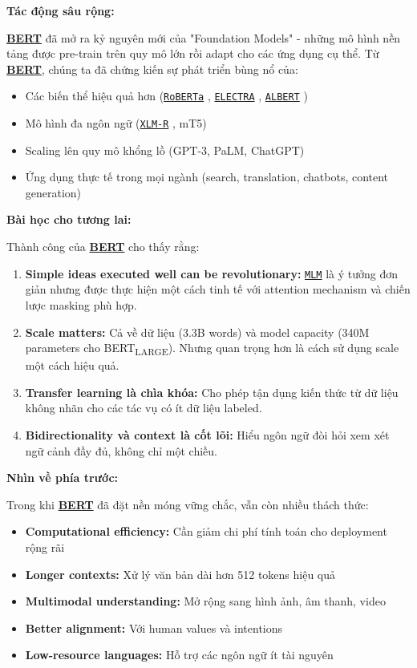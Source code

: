 \textbf{Tác động sâu rộng:}

\hyperref[acro:bert]{\textbf{BERT}} đã mở ra kỷ nguyên mới của "Foundation Models" - những mô hình nền tảng được pre-train trên quy mô lớn rồi adapt cho các ứng dụng cụ thể. Từ \hyperref[acro:bert]{\textbf{BERT}}, chúng ta đã chứng kiến sự phát triển bùng nổ của:

\begin{itemize}
    \item Các biến thể hiệu quả hơn (\hyperref[acro:roberta]{\texttt{RoBERTa}} \cite{liu2019roberta}, \hyperref[acro:electra]{\texttt{ELECTRA}} \cite{clark2020electra}, \hyperref[acro:albert]{\texttt{ALBERT}} \cite{lan2019albert})
    \item Mô hình đa ngôn ngữ (\hyperref[acro:xlm-r]{\texttt{XLM-R}} \cite{conneau2019unsupervised}, mT5)
    \item Scaling lên quy mô khổng lồ (GPT-3, PaLM, ChatGPT)
    \item Ứng dụng thực tế trong mọi ngành (search, translation, chatbots, content generation)
\end{itemize}

\textbf{Bài học cho tương lai:}

Thành công của \hyperref[acro:bert]{\textbf{BERT}} cho thấy rằng:
\begin{enumerate}
    \item \textbf{Simple ideas executed well can be revolutionary:} \hyperref[acro:mlm]{\texttt{MLM}} là ý tưởng đơn giản nhưng được thực hiện một cách tinh tế với attention mechanism và chiến lược masking phù hợp.
    
    \item \textbf{Scale matters:} Cả về dữ liệu (3.3B words) và model capacity (340M parameters cho BERT\textsubscript{LARGE}). Nhưng quan trọng hơn là cách sử dụng scale một cách hiệu quả.
    
    \item \textbf{Transfer learning là chìa khóa:} Cho phép tận dụng kiến thức từ dữ liệu không nhãn cho các tác vụ có ít dữ liệu labeled.
    
    \item \textbf{Bidirectionality và context là cốt lõi:} Hiểu ngôn ngữ đòi hỏi xem xét ngữ cảnh đầy đủ, không chỉ một chiều.
\end{enumerate}

\textbf{Nhìn về phía trước:}

Trong khi \hyperref[acro:bert]{\textbf{BERT}} đã đặt nền móng vững chắc, vẫn còn nhiều thách thức:
\begin{itemize}
    \item \textbf{Computational efficiency:} Cần giảm chi phí tính toán cho deployment rộng rãi
    \item \textbf{Longer contexts:} Xử lý văn bản dài hơn 512 tokens hiệu quả
    \item \textbf{Multimodal understanding:} Mở rộng sang hình ảnh, âm thanh, video
    \item \textbf{Better alignment:} Với human values và intentions
    \item \textbf{Low-resource languages:} Hỗ trợ các ngôn ngữ ít tài nguyên
\end{itemize}

